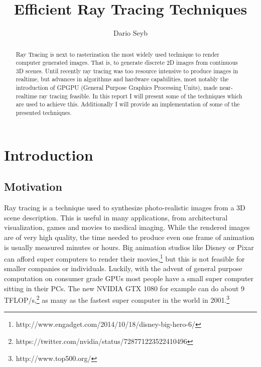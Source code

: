 \documentclass{ACGSeminar}
\begin{document}
\title{Efficient Ray Tracing Techniques}

\author{Dario Seyb}

\maketitle


\begin{abstract}
Ray Tracing is next to rasterization the most widely used technique to render computer generated images. That is, to generate discrete 2D images from continuous 3D scenes. Until recently ray tracing was too resource intensive to produce images in realtime, but advances in algorithms and hardware capabilities, most notably the introduction of GPGPU (General Purpose Graphics Processing Units), made near-realtime ray tracing feasible. In this report I will present some of the techniques which are used to achieve this. Additionally I will provide an implementation of some of the presented techniques.
\end{abstract}

\tableofcontents


\section{Introduction} \label{introduction}
\subsection{Motivation}
Ray tracing is a technique used to synthesize photo-realistic images from a 3D scene description. This is useful in many applications, from architectural visualization, games and movies to medical imaging. While the rendered images are of very high quality, the time needed to produce even one frame of animation is usually measured minutes or hours. Big animation studios like Disney or Pixar can afford super computers to render their movies,\footnote{http://www.engadget.com/2014/10/18/disney-big-hero-6/} but this is not feasible for smaller companies or individuals. Luckily, with the advent of general purpose computation on consumer grade GPUs most people have a small super computer sitting in their PCs. The new NVIDIA GTX 1080 for example can do about 9 TFLOP/s,\footnote{https://twitter.com/nvidia/status/728771223522410496} as many as the fastest super computer in the world in 2001.\footnote{http://www.top500.org/}
\end{document}
